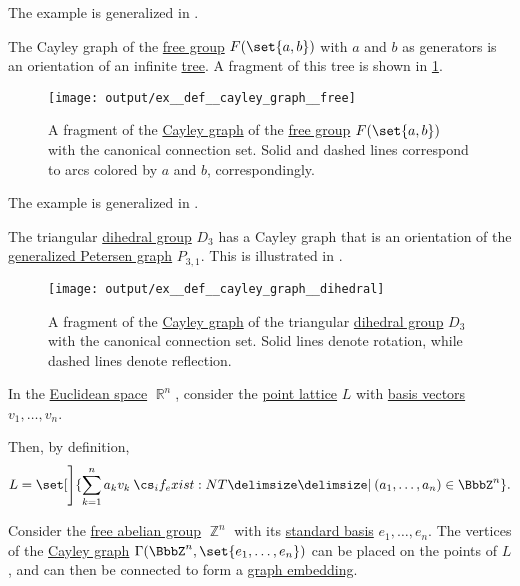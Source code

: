 \begin{example}
\begin{thmenum}
    The example is generalized in .

     The Cayley graph of the \hyperref[def:free_group]{free group} \( F(\set{ a, b }) \) with \( a \) and \( b \) as generators is an orientation of an infinite \hyperref[def:tree]{tree}. A fragment of this tree is shown in \cref{fig:ex:def:cayley_graph/free}.

    \begin{figure}[!ht]
      \centering
      \texttt{[image: output/ex\_\_def\_\_cayley\_graph\_\_free]}
      \caption{A fragment of the \hyperref[def:cayley_graph]{Cayley graph} of the \hyperref[def:free_group]{free group} \( F(\set{ a, b }) \) with the canonical connection set. Solid and dashed lines correspond to arcs colored by \( a \) and \( b \), correspondingly.}\label{fig:ex:def:cayley_graph/free}
    \end{figure}

    The example is generalized in .

     The triangular \hyperref[def:dihedral_group]{dihedral group} \( D_3 \) has a Cayley graph that is an orientation of the \hyperref[def:petersen_graph]{generalized Petersen graph} \( P_{3,1} \). This is illustrated in .

    \begin{figure}[!ht]
      \centering
      \texttt{[image: output/ex\_\_def\_\_cayley\_graph\_\_dihedral]}
      \caption{A fragment of the \hyperref[def:cayley_graph]{Cayley graph} of the triangular \hyperref[def:dihedral_group]{dihedral group} \( D_3 \) with the canonical connection set. Solid lines denote rotation, while dashed lines denote reflection.}\label{fig:ex:def:cayley_graph/dihedral}
    \end{figure}

     In the \hyperref[def:euclidean_space]{Euclidean space} \( \BbbR^n \), consider the \hyperref[def:point_lattice]{point lattice} \( L \) with \hyperref[def:point_lattice_basis]{basis vectors} \( v_1, \ldots, v_n \).

    Then, by definition,
    \begin{equation*}
      L = \set[\Bigg]{ \sum_{k=1}^n a_k v_k \given* (a_1, \ldots, a_n) \in \BbbZ^n }.
    \end{equation*}

    Consider the \hyperref[def:free_abelian_group]{free abelian group} \( \BbbZ^n \) with its \hyperref[def:sequence_space]{standard basis} \( e_1, \ldots, e_n \). The vertices of the \hyperref[def:cayley_graph]{Cayley graph} \( \Gamma(\BbbZ^n, \set{ e_1, \ldots, e_n }) \) can be placed on the points of \( L \), and can then be connected to form a \hyperref[def:graph_geometric_realization/embedding]{graph embedding}.
  \end{thmenum}
\end{example}

